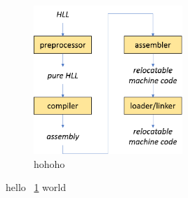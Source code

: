 





\begin{figure}
	\centering
	
	\includegraphics[width=0.5\textwidth]{HLLToMC}	
	
	\caption{hohoho}
	\label{fig:bla}
\end{figure}

hello ~\ref{fig:bla} world


